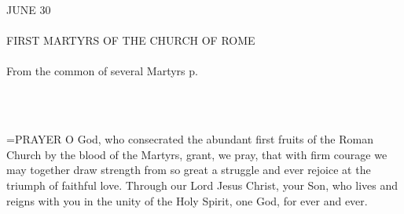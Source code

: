 \begin{center}\normalsize \begin{center}\normalsize JUNE 30\\\\
\footnotesize \footnotesize FIRST MARTYRS OF THE CHURCH OF ROME\\\\
\footnotesize \footnotesize From the common of several Martyrs p.\\\\
\footnotesize \end{center}\\
\end{center}

\hangindent=\parindent \small{PRAYER 
O God, who consecrated
the abundant first fruits of the Roman Church
by the blood of the Martyrs,
grant, we pray, that with firm courage
we may together draw strength from so great a struggle
and ever rejoice at the triumph of faithful love.
Through our Lord Jesus Christ, your Son,
who lives and reigns with you in the unity of the Holy Spirit,
one God, for ever and ever.\\}
 
